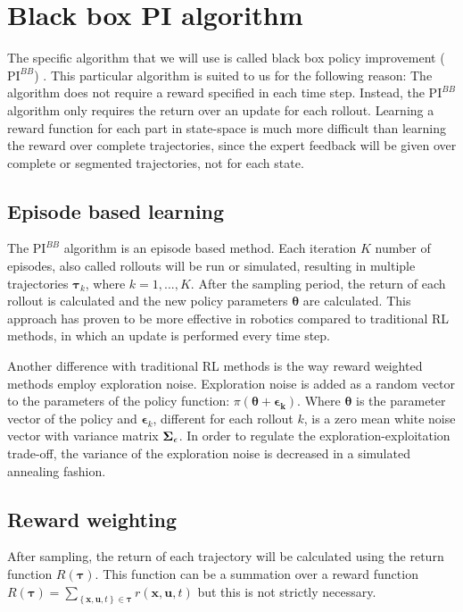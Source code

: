 \documentclass[mscThesis.tex]{subfiles}
\begin{document}
\section{Black box PI algorithm}
\label{sec:PIBB}
The specific algorithm that we will use is called black box policy improvement ($\text{PI}^{BB}$) \cite{Stulp2012}. This particular algorithm is suited to us for the following reason: The algorithm does not require a reward specified in each time step. Instead, the $\text{PI}^{BB}$ algorithm only requires the return over an update for each rollout. Learning a reward function for each part in state-space is much more difficult than learning the reward over complete trajectories, since the expert feedback will be given over complete or segmented trajectories, not for each state. 

\subsection{Episode based learning}
The $\text{PI}^{BB}$ algorithm is an episode based method. Each iteration $K$ number of episodes, also called rollouts will be run or simulated, resulting in multiple trajectories $\bm{\tau}_k$, where $k = 1,..., K$. After the sampling period, the return of each rollout is calculated and the new policy parameters $\bm{\theta}$ are calculated. This approach has proven to be more effective in robotics compared to traditional RL methods, in which an update is performed every time step. 

Another difference with traditional RL methods is the way reward weighted methods employ exploration noise. Exploration noise is added as a random vector to the parameters of the policy function: $\pi(\bm{\theta}+\bm{\epsilon_k})$. Where $\bm{\theta}$ is the parameter vector of the policy and $\bm{\epsilon}_k$, different for each rollout $k$, is a zero mean white noise vector with variance matrix $\mathbf{\Sigma}_{\epsilon}$. In order to regulate the exploration-exploitation trade-off, the variance of the exploration noise is decreased in a simulated annealing fashion.

\subsection{Reward weighting}
After sampling, the return of each trajectory will be calculated using the return function $R( \bm{\tau})$. This function can be a summation over a reward function $R( \bm{\tau}) = \sum_{\left\{ \bm{x},\bm{u},t \right\} \in \bm{\tau}} r(\bm{x}, \bm{u}, t)$ but this is not strictly necessary. 
\end{document}
